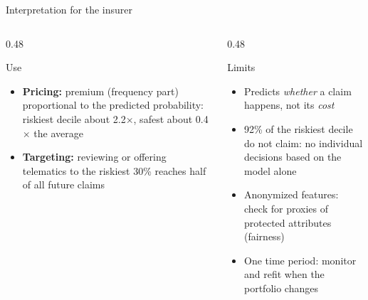 \documentclass[aspectratio=169,11pt]{beamer}
\begin{document}
\begin{frame}{Interpretation for the insurer}
  \begin{columns}[T]
    \begin{column}{0.48\textwidth}
      \begin{block}{Use}
        \begin{itemize}
          \item \textbf{Pricing:} premium (frequency part) proportional to the predicted probability:
                riskiest decile about 2.2$\times$, safest about 0.4$\times$ the average
          \item \textbf{Targeting:} reviewing or offering telematics to the riskiest 30\% reaches half of
                all future claims
        \end{itemize}
      \end{block}
    \end{column}
    \begin{column}{0.48\textwidth}
      \begin{block}{Limits}
        \begin{itemize}
          \item Predicts \emph{whether} a claim happens, not its \emph{cost}
          \item 92\% of the riskiest decile do not claim: no individual decisions based on the model alone
          \item Anonymized features: check for proxies of protected attributes (fairness)
          \item One time period: monitor and refit when the portfolio changes
        \end{itemize}
      \end{block}
    \end{column}
  \end{columns}
\end{frame}
\end{document}
